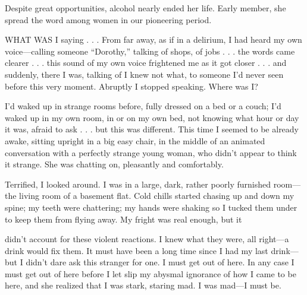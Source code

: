 

\bbChapterPreamble




\begin{biblechapter}
    Despite great opportunities, 
    alcohol nearly ended her life.
\verse Early member, 
    she spread the word among women 
    in our pioneering period.

\end{biblechapter}


\begin{biblechapter}
    WHAT WAS I saying . . . 
    From far away, as if in a delirium, 
    I had heard my own voice—calling someone “Dorothy,” 
    talking of shops, of jobs . . . 
    the words came clearer . . . 
    this sound of my own voice frightened me as it got closer . . . 
    and suddenly, there I was, 
    talking of I knew not what, 
    to someone I’d never seen before this very moment. 
\verse Abruptly I stopped speaking.
\verse Where was I?

\verse I’d waked up in strange rooms before, fully dressed on a bed or a couch; I’d waked up in my own room, in or on my own bed, not knowing what hour or day it was, afraid to ask . . . but this was different. This time I seemed to be already awake, sitting upright in a big easy chair, in the middle of an animated conversation with a perfectly strange young woman, who didn’t appear to think it strange. She was chatting on, pleasantly and comfortably.

Terrified, I looked around. I was in a large, dark, rather poorly furnished room—the living room of a basement flat. Cold chills started chasing up and down my spine; my teeth were chattering; my hands were shaking so I tucked them under to keep them from flying away. My fright was real enough, but it

didn’t account for these violent reactions. I knew what they were, all right—a drink would fix them. It must have been a long time since I had my last drink—but I didn’t dare ask this stranger for one. I must get out of here. In any case I must get out of here before I let slip my abysmal ignorance of how I came to be here, and she realized that I was stark, staring mad. I was mad—I must be.


\end{biblechapter}
